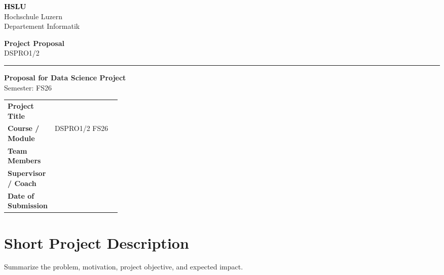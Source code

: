 \documentclass[11pt,a4paper]{article}
\newcommand{\hsluwordmark}{%
  {\fontsize{22}{24}\selectfont\bfseries\textcolor{black}{HSLU}}%
}
\newcommand{\proposaltype}{%
  {\fontsize{13}{15}\selectfont\bfseries Project Proposal}
}
\newcommand{\moduleline}{%
  {\fontsize{11}{13}\selectfont DSPRO1/2}
}
\begin{document}
\begin{minipage}[t]{0.62\textwidth}
    \hsluwordmark\\[-1mm]
    {\small\color{hsluGray}Hochschule Luzern}\\[-0.5mm]
    {\small\color{hsluGray}Departement Informatik}
\end{minipage}
\hfill
\begin{minipage}[t]{0.35\textwidth}
    \raggedleft
    \proposaltype\\[1mm]
    \moduleline
\end{minipage}

\vspace{8mm}
{\color{hsluGray}\rule{\textwidth}{1.2pt}}

\vspace{8mm}

\begin{center}
    {\LARGE\bfseries\color{hsluDark}Proposal for Data Science Project}\\[1mm]
    {\large\color{hsluGray}Semester: FS26}
\end{center}

\vspace{8mm}

\colorbox{boxGray}{%
\parbox{\dimexpr\linewidth-2\fboxsep\relax}{
\vspace{1mm}
\renewcommand{\arraystretch}{1.35}
\begin{tabularx}{\linewidth}{>{\bfseries}p{0.26\linewidth} X}
Project Title & \\
Course / Module & DSPRO1/2 FS26 \\
Team Members & \\
Supervisor / Coach & \\
Date of Submission & \\
\end{tabularx}
\vspace{1mm}
}
}

\vspace{1em}

\section{Short Project Description}
Summarize the problem, motivation, project objective, and expected impact.
\end{document}
